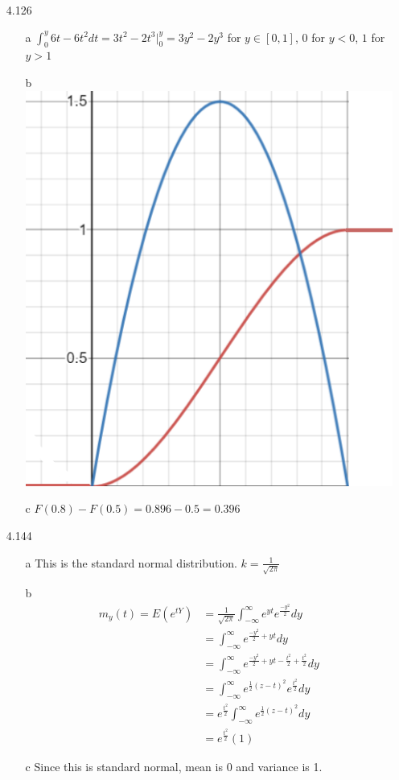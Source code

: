 \documentclass[11pt]{article}
\begin{document}
\begin{enumerate}
        \item[4.126]
        \begin{enumerate}
            \item[a] $\int_0^y 6t-6t^2 dt = 3t^2 - 2t^3 |_0^y = 3y^2 - 2y^3$ for $y \in [0,1]$, $0$ for $y < 0$, $1$ for $y > 1$
            \item[b] \includegraphics{4.126.b.PNG}
            \item[c] $F(0.8) - F(0.5) = 0.896 - 0.5 = 0.396$
        \end{enumerate}

        \item[4.144]
        \begin{enumerate}
            \item[a] This is the standard normal distribution. $k = \frac{1}{\sqrt{2\pi}}$
            \item[b]
            \begin{align*}
                m_y(t) = E(e^{tY}) &= \frac{1}{\sqrt{2\pi}} \int_{-\infty}^{\infty} e^{yt} e^{\frac{-y^2}{2}} dy \\
                &= \int_{-\infty}^{\infty} e^{\frac{-y^2}{2} + yt} dy \\
                &= \int_{-\infty}^{\infty} e^{\frac{-y^2}{2} + yt - \frac{t^2}{2} + \frac{t^2}{2}} dy \\
                &= \int_{-\infty}^{\infty} e^{\frac{1}{2}(z - t)^2} e^{\frac{t^2}{2}} dy \\
                &= e^{\frac{t^2}{2}} \int_{-\infty}^{\infty} e^{\frac{1}{2}(z - t)^2} dy \\
                &= e^{\frac{t^2}{2}} (1)
            \end{align*}
            \item[c] Since this is standard normal, mean is 0 and variance is 1.
        \end{enumerate}   
    \end{enumerate}
\end{document}
